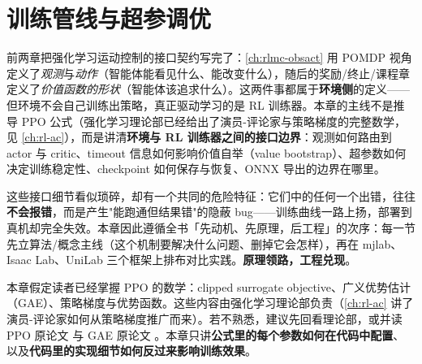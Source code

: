 \chapter{训练管线与超参调优}\label{ch:rlmc-training}


前两章把强化学习运动控制的接口契约写完了：\cref{ch:rlmc-obsact} 用 POMDP 视角定义了\emph{观测}与\emph{动作}（智能体能看见什么、能改变什么），随后的奖励/终止/课程章定义了\emph{价值函数的形状}（智能体该追求什么）。这两件事都属于\textbf{环境侧}的定义——但环境不会自己训练出策略，真正驱动学习的是 RL 训练器。本章的主线不是推导 PPO 公式（强化学习理论部已经给出了演员-评论家与策略梯度的完整数学，见 \cref{ch:rl-ac}），而是讲清\textbf{环境与 RL 训练器之间的接口边界}：观测如何路由到 actor 与 critic、timeout 信息如何影响价值自举（value bootstrap）、超参数如何决定训练稳定性、checkpoint 如何保存与恢复、ONNX 导出的边界在哪里。

这些接口细节看似琐碎，却有一个共同的危险特征：它们中的任何一个出错，往往\textbf{不会报错}，而是产生"能跑通但结果错"的隐蔽 bug——训练曲线一路上扬，部署到真机却完全失效。本章因此遵循全书「先动机、先原理，后工程」的次序：每一节先立算法/概念主线（这个机制要解决什么问题、删掉它会怎样），再在 mjlab、Isaac Lab、UniLab 三个框架上排布对比实践。\textbf{原理领路，工程兑现}。

\begin{note}
本章假定读者已经掌握 PPO 的数学：clipped surrogate objective、广义优势估计（GAE）、策略梯度与优势函数。这些内容由强化学习理论部负责（\cref{ch:rl-ac} 讲了演员-评论家如何从策略梯度推广而来）。若不熟悉，建议先回看理论部，或并读 PPO 原论文 \cite{schulman2017ppo} 与 GAE 原论文 \cite{schulman2015gae}。本章只讲\textbf{公式里的每个参数如何在代码中配置}、以及\textbf{代码里的实现细节如何反过来影响训练效果}。
\end{note}

